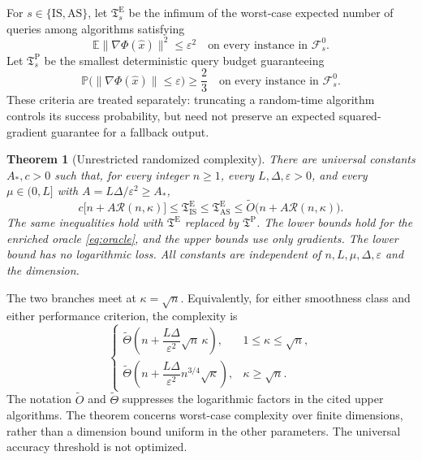 \documentclass[11pt,letterpaper]{article}
\newtheorem{theorem}{Theorem}[section]
\theoremstyle{definition}
\theoremstyle{remark}
\newcommand{\E}{\mathbb E}
\newcommand{\PP}{\mathbb P}
\newcommand{\cF}{\mathcal F}
\newcommand{\cR}{\mathcal R}
\newcommand{\T}{\mathfrak T}
\begin{document}
For $s\in\{\mathrm{IS},\mathrm{AS}\}$, let $\T_s^{\mathrm E}$ be the infimum
of the worst-case expected number of queries among algorithms satisfying
\begin{equation}
 \E\|\nabla\Phi(\widehat x)\|^2\le\varepsilon^2
 \quad\text{on every instance in }\cF_s^0.
 \label{eq:expected-criterion}
\end{equation}
Let $\T_s^{\mathrm P}$ be the smallest deterministic query budget guaranteeing
\begin{equation}
 \PP\bigl(\|\nabla\Phi(\widehat x)\|\le\varepsilon\bigr)\ge\frac23
 \quad\text{on every instance in }\cF_s^0.
 \label{eq:probability-criterion}
\end{equation}
These criteria are treated separately: truncating a random-time algorithm
controls its success probability, but need not preserve an expected
squared-gradient guarantee for a fallback output.

\begin{theorem}[Unrestricted randomized complexity]
\label{thm:main}
There are universal constants $A_*,c>0$ such that, for every integer $n\ge1$,
every $L,\Delta,\varepsilon>0$, and every $\mu\in(0,L]$ with
$A=L\Delta/\varepsilon^2\ge A_*$,
\begin{equation}
 c\bigl[n+A\cR(n,\kappa)\bigr]
 \le \T^{\mathrm E}_{\mathrm{IS}}
 \le \T^{\mathrm E}_{\mathrm{AS}}
 \le \widetilde O\bigl(n+A\cR(n,\kappa)\bigr).
 \label{eq:main-complexity}
\end{equation}
The same inequalities hold with $\T^{\mathrm E}$ replaced by
$\T^{\mathrm P}$. The lower bounds hold for the enriched oracle
\eqref{eq:oracle}, and the upper bounds use only gradients. The lower bound
has no logarithmic loss. All constants are independent of $n,L,\mu,\Delta,
\varepsilon$ and the dimension.
\end{theorem}

The two branches meet at $\kappa=\sqrt n$. Equivalently, for either
smoothness class and either performance criterion, the complexity is
\begin{equation}
 \begin{cases}
 \widetilde\Theta\!\left(n+\dfrac{L\Delta}{\varepsilon^2}
                 \sqrt n\,\kappa\right),
       &1\le\kappa\le\sqrt n,\\[5pt]
 \widetilde\Theta\!\left(n+\dfrac{L\Delta}{\varepsilon^2}
                 n^{3/4}\sqrt\kappa\right),
       &\kappa\ge\sqrt n.
 \end{cases}
 \label{eq:two-regimes}
\end{equation}
The notation $\widetilde O$ and $\widetilde\Theta$ suppresses the
logarithmic factors in the cited upper algorithms. The theorem concerns
worst-case complexity over finite dimensions, rather than a dimension bound
uniform in the other parameters. The universal accuracy threshold is not
optimized.
\end{document}
